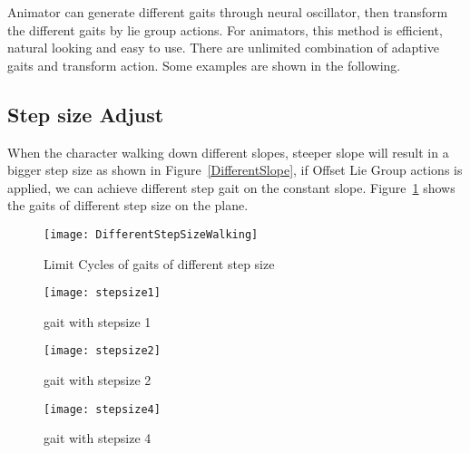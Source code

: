 Animator can generate different gaits through neural oscillator, then transform the different gaits by lie group actions.
For animators, this method is efficient, natural looking and easy to use.
There are unlimited combination of adaptive gaits and transform action.
Some examples are shown in the following.


\subsection{Step size Adjust}
When the character walking down different slopes, steeper slope will result in a bigger step size as shown in Figure~\ref{DifferentSlope}, if Offset Lie Group actions is applied, we can achieve different step gait on the constant slope.
Figure~\ref{fig:differentstepsizeonplaine} shows the gaits of different step size on the plane.

\begin{figure}[!htbp]
  \begin{center}
      \texttt{[image: DifferentStepSizeWalking]}
    \caption{Limit Cycles of gaits of different step size}
    \label{fig:differentstepsizeonplaine}
\end{center}
\end{figure}



\begin{figure}[!htbp]
  \begin{center}
      \texttt{[image: stepsize1]}
    \caption{gait with stepsize 1}
    \label{fig:ssp1}
\end{center}
\end{figure}

\begin{figure}[!htbp]
  \begin{center}
      \texttt{[image: stepsize2]}
    \caption{gait with stepsize 2}
    \label{fig:ssp2}
\end{center}
\end{figure}

\begin{figure}[!htbp]
  \begin{center}
      \texttt{[image: stepsize4]}
    \caption{gait with stepsize 4}
    \label{fig:ssp3}
\end{center}
\end{figure}







